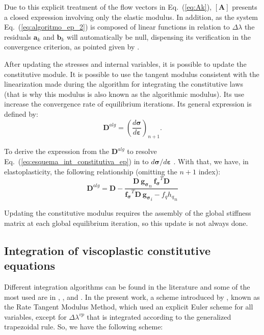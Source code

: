\documentclass[Journal,letterpaper]{ascelike-new}
\newcommand{\All}{\boldsymbol A}
\newcommand{\al}{\boldsymbol a}
\newcommand{\bl}{\boldsymbol b}
\newcommand{\dfds}{\boldsymbol{f_\sigma}}
\newcommand{\dfdq}{{f_q}}
\newcommand{\dgds}{\boldsymbol{g_\sigma}}
\newcommand{\Dsdee}{\boldsymbol{D}}
\newcommand{\hl}{{h_q}}
\newcommand{\strain}{\boldsymbol{\varepsilon}}
\newcommand{\stress}{\boldsymbol{\sigma}}
\begin{document}
Due to this explicit treatment of the flow vectors in Eq.~(\ref{eq:Ak}), $\left[\All \right]$ presents a closed expression involving only the elastic modulus. In addition, as the system Eq.~(\ref{eq:algoritmo_ep_2}) is composed of linear functions in relation to $\Delta \lambda$ the residuals  $\al_k$ and $\bl_k$ will automatically be null, dispensing its verification in the convergence criterion, as pointed given by . 

After updating the stresses and internal variables, it is possible to update the constitutive module. It is possible to use the tangent modulus consistent with the linearization made during the algorithm for integrating the constitutive laws (that is why this modulus is also known as the algorithmic modulus). Its use increase the convergence rate of equilibrium iterations. Its general expression is defined by:
\begin{equation}
	\label{eq:D_alg1}
	\Dsdee^{alg} = \left(\dfrac{d\stress}{d\strain} \right)_{n+1}.
\end{equation}

To derive the expression from the $\Dsdee^{alg}$ to resolve Eq.~(\ref{eq:esquema_int_constitutiva_ep}) in to $d\stress/d\strain$ \cite{belytschko2000}. With that, we have, in elastoplasticity, the following relationship (omitting the $n+1$ index): 
\begin{equation}
	\label{eq:D_alg_ep}
	\Dsdee^{alg} = \Dsdee - \dfrac{\Dsdee~\dgds_n~\dfds^T \Dsdee}{\dfds^T\Dsdee~\dgds_i-\dfdq \hl_n}
\end{equation}

Updating the constitutive modulus requires the assembly of the global stiffness matrix at each global equilibrium iteration, so this update is not always done.


\subsection{Integration of viscoplastic constitutive equations}

Different integration algorithms can be found in the literature and some of the most used are in , ,  and . In the present work, a scheme introduced by , known as the Rate Tangent Modulus Method, which used an explicit Euler scheme for all variables, except for $\Delta \lambda^{vp}$ that is integrated according to the generalized trapezoidal rule. So, we have the following scheme:
\end{document}
